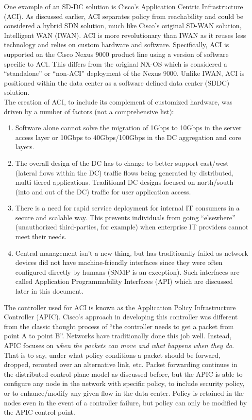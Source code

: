 One example of an SD-DC solution is Cisco's Application Centric Infrastructure
(ACI). As discussed earlier, ACI separates policy from reachability and could
be considered a hybrid SDN solution, much like Cisco's original SD-WAN
solution, Intelligent WAN (IWAN). ACI is more revolutionary than IWAN as it
reuses less technology and relies on custom hardware and software.
Specifically, ACI is supported on the Cisco Nexus 9000 product line using a
version of software specific to ACI\@. This differs from the original NX-OS
which is considered a ``standalone'' or ``non-ACI'' deployment of the Nexus 9000.
Unlike IWAN, ACI is positioned within the data center as a software defined
data center (SDDC) solution. \\

The creation of ACI, to include its complement of customized hardware, was
driven by a number of factors (not a comprehensive list):

\begin{enumerate}
  \item Software alone cannot solve the migration of 1Gbps to 10Gbps in the
  server access layer or 10Gbps to 40Gbps/100Gbps in the DC aggregation and
  core layers.
  \item The overall design of the DC has to change to better support east/west
  (lateral flows within the DC) traffic flows being generated by distributed,
  multi-tiered applications. Traditional DC designs focused on north/south
  (into and out of the DC) traffic for user application access.
  \item There is a need for rapid service deployment for internal IT consumers
  in a secure and scalable way. This prevents individuals from going
  ``elsewhere'' (unauthorized third-parties, for example) when enterprise IT
  providers cannot meet their needs.
  \item Central management isn’t a new thing, but has traditionally failed as
  network devices did not have machine-friendly interfaces since they were
  often configured directly by humans (SNMP is an exception). Such interfaces
  are called Application Programmability Interfaces (API) which are discussed
  later in this document.
\end{enumerate}

The controller used for ACI is known as the Application Policy Infrastructure
Controller (APIC). Cisco’s approach in developing this controller was
different from the classic thought process of ``the controller needs to get a
packet from point A to point B''. Networks have traditionally done this job
well. Instead, APIC focuses on \textit{when the packets can move and what
happens when they do}. That is to say, under what policy conditions a
packet should be forward, dropped, rerouted over an alternative link, etc.
Packet forwarding continues in the distributed control-plane model as
discussed before, but the APIC is able to configure any node in the network
with specific policy, to include security policy, or to enhance/modify any
given flow in the data center. Policy is retained in the nodes even in the
event of a controller failure, but policy can only be modified by the APIC
control point. \\

